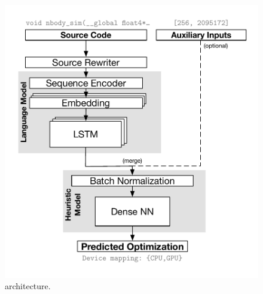 \begin{figure}
  \centering
  \includegraphics[width=\columnwidth]{img/deeptune} %
  \vspace{-2em}%
  \caption{%
    \DeepTune architecture.
  }%
  \label{fig:deeptune}
\end{figure}
